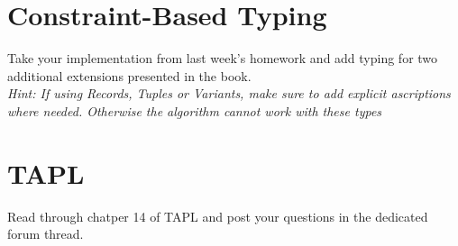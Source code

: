 \section{Constraint-Based Typing}
Take your implementation from last week's homework and add typing for two additional extensions presented in the book. \\
\emph{Hint: If using Records, Tuples or Variants, make sure to add explicit ascriptions where needed. Otherwise the algorithm cannot work with these types}

\section{TAPL}
Read through chatper 14 of TAPL and post your questions in the dedicated forum thread.
